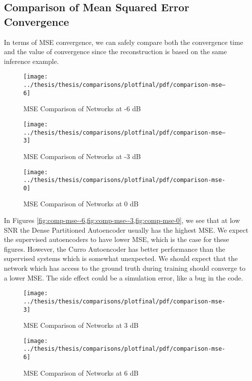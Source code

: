 \subsection{Comparison of Mean Squared Error Convergence}

In terms of MSE convergence, we can safely compare both the convergence time and the value of convergence since the reconstruction is based on the same inference example.

\begin{figure}[!ht]
\centering
\texttt{[image: ../thesis/thesis/comparisons/plotfinal/pdf/comparison-mse--6]}
\caption{MSE Comparison of Networks at -6 dB}\label{fig:comp-mse--6}
\end{figure}

\begin{figure}[!ht]
\centering
\texttt{[image: ../thesis/thesis/comparisons/plotfinal/pdf/comparison-mse--3]}
\caption{MSE Comparison of Networks at -3 dB}\label{fig:comp-mse--3}
\end{figure}

\begin{figure}[!ht]
\centering
\texttt{[image: ../thesis/thesis/comparisons/plotfinal/pdf/comparison-mse-0]}
\caption{MSE Comparison of Networks at 0 dB}\label{fig:comp-mse-0}
\end{figure}

In Figures \cref{fig:comp-mse--6,fig:comp-mse--3,fig:comp-mse-0}, we see that at low SNR the Dense Partitioned Autoencoder usually has the highest MSE. We expect the supervised autoencoders to have lower MSE, which is the case for these figures. However, the Curro Autoencoder has better performance than the supervised systems which is somewhat unexpected. We should expect that the network which has access to the ground truth during training should converge to a lower MSE. The side effect could be a simulation error, like a bug in the code.

\begin{figure}[!ht]
\centering
\texttt{[image: ../thesis/thesis/comparisons/plotfinal/pdf/comparison-mse-3]}
\caption{MSE Comparison of Networks at 3 dB}\label{fig:comp-mse-3}
\end{figure}

\begin{figure}[!ht]
\centering
\texttt{[image: ../thesis/thesis/comparisons/plotfinal/pdf/comparison-mse-6]}
\caption{MSE Comparison of Networks at 6 dB}\label{fig:comp-mse-6}
\end{figure}

